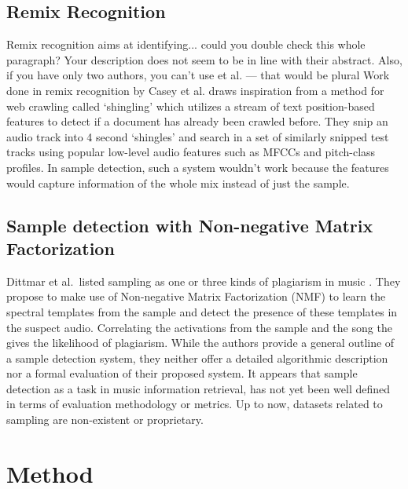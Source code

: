 \documentclass{article}
\begin{document}
\subsection{Remix Recognition}
Remix recognition aims at identifying... {\color{red}could you double check this whole paragraph? Your description does not seem to be in line with their abstract. Also, if you have only two authors, you can't use et al. --- that would be plural}
Work done in remix recognition by Casey et al. \cite{caseyRemix} draws inspiration from a method for web crawling called `shingling' which utilizes a stream of text position-based features to detect if a document has already been crawled before. They snip an audio track into 4 second `shingles' and search in a set of similarly snipped test tracks using popular low-level audio features such as MFCCs and pitch-class profiles. In sample detection, such a system wouldn't work because the features would capture information of the whole mix instead of just the sample.

\subsection{Sample detection with Non-negative Matrix Factorization}
%
Dittmar et al.\ listed sampling as one or three kinds of plagiarism in music \cite{dittmar2012audio}. They propose to make use of Non-negative Matrix Factorization (NMF) to learn the spectral templates from the sample and detect the presence of these templates in the suspect audio. Correlating the activations from the sample and the song the gives the likelihood of plagiarism.
%
While the authors provide a general outline of a sample detection system, they neither offer a detailed algorithmic description nor a formal evaluation of their proposed system. It appears that sample detection as a task in music information retrieval, has not yet been well defined in terms of evaluation methodology or metrics. Up to now, datasets related to sampling are non-existent or proprietary.


\section{Method}
\label{algo}
\end{document}
